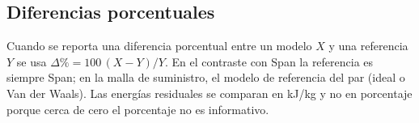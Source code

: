 \subsection{Diferencias porcentuales}
Cuando se reporta una diferencia porcentual entre un modelo $X$ y una referencia $Y$ se usa
$\Delta\%=100\,(X-Y)/Y$. En el contraste con Span la referencia es siempre Span; en la malla de suministro, el
modelo de referencia del par (ideal o Van der Waals). Las energías residuales se comparan en kJ/kg y no en
porcentaje porque cerca de cero el porcentaje no es informativo.
